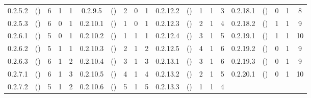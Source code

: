 {\begin{longtable}{ccccc|ccccc|ccccc|ccccc}
\rowcolor{lightgray}
0.2.5.2 & () & 6 & 1 & 1 & 0.2.9.5 & () & 2 & 0 & 1 & 0.2.12.2 & () & 1 & 1 & 3 & 0.2.18.1 & () & 0 & 1 & 8\\
0.2.5.3 & () & 6 & 0 & 1 & 0.2.10.1 & () & 1 & 0 & 1 & 0.2.12.3 & () & 2 & 1 & 4 & 0.2.18.2 & () & 1 & 1 & 9\\
\rowcolor{lightgray}
0.2.6.1 & () & 5 & 0 & 1 & 0.2.10.2 & () & 1 & 1 & 1 & 0.2.12.4 & () & 3 & 1 & 5 & 0.2.19.1 & () & 1 & 1 & 10\\
0.2.6.2 & () & 5 & 1 & 1 & 0.2.10.3 & () & 2 & 1 & 2 & 0.2.12.5 & () & 4 & 1 & 6 & 0.2.19.2 & () & 0 & 1 & 9\\
\rowcolor{lightgray}
0.2.6.3 & () & 6 & 1 & 2 & 0.2.10.4 & () & 3 & 1 & 3 & 0.2.13.1 & () & 3 & 1 & 6 & 0.2.19.3 & () & 0 & 1 & 9\\
0.2.7.1 & () & 6 & 1 & 3 & 0.2.10.5 & () & 4 & 1 & 4 & 0.2.13.2 & () & 2 & 1 & 5 & 0.2.20.1 & () & 0 & 1 & 10\\
\rowcolor{lightgray}
  0.2.7.2 & () & 5 & 1 & 2 & 0.2.10.6 & () & 5 & 1 & 5 & 0.2.13.3 & () & 1 & 1 & 4 & & & & & \\
\hline\end{longtable}
}
